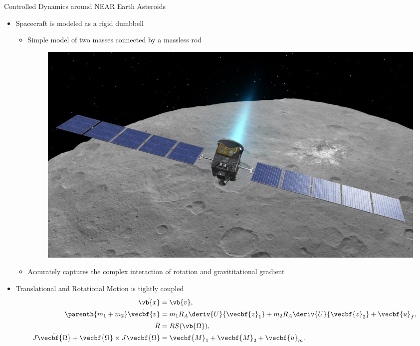 \documentclass[final, usenames, dvipsnames]{beamer}
\newlength{\twocolwidth}
\begin{document}
\begin{frame}[t]
\begin{columns}[T,onlytextwidth]
\begin{column}{\twocolwidth}
\begin{block}{Controlled Dynamics around NEAR Earth Asteroids} %
	\begin{minipage}{0.5\columnwidth} %
	\begin{itemize}
            \item Spacecraft is modeled as a rigid dumbbell
                \begin{itemize}
                    \item Simple model of two masses connected by a massless rod 
                        \begin{figure}
                            \centering
                            \includegraphics[width=0.6\columnwidth]{figures/dawn.jpg}
                        \end{figure}
                    \item Accurately captures the complex interaction of rotation and gravititational gradient
                \end{itemize}
            \item Translational and Rotational Motion is tightly coupled
                \begin{align*}
                    \dot{\vb{x}} &= \vb{v}, \\
                    \parenth{m_1 + m_2} \dot{\vecbf{v}} &= m_1 R_A \deriv{U}{\vecbf{z}_1} + m_2 R_A \deriv{U}{\vecbf{z}_2} + \vecbf{u}_f, \\
                    \dot{R} &= R S(\vb{\Omega}) , \\
                    J \dot{\vecbf{\Omega}} + \vecbf{\Omega} \times J \vecbf{\Omega} &= \vecbf{M}_1 + \vecbf{M}_2 + \vecbf{u}_m. 
                \end{align*}


\end{itemize}
\end{minipage}
\end{block}
\end{column}
\end{columns}
\end{frame}
\end{document}
